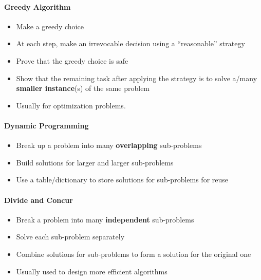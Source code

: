                 \paragraph{Greedy Algorithm}
                    \begin{itemize}
                        \item Make a greedy choice
                        \item At each step, make an irrevocable decision using a ``reasonable'' strategy
                        \item Prove that the greedy choice is safe
                        \item Show that the remaining task after applying the strategy is to solve a/many \textbf{smaller instance}(s) of the same problem
                        \item Usually for optimization problems.
                    \end{itemize}

                \paragraph{Dynamic Programming}
                    \begin{itemize}
                        \item Break up a problem into many \textbf{overlapping} sub-problems
                        \item Build solutions for larger and larger sub-problems
                        \item Use a table/dictionary to store solutions for sub-problems for reuse
                    \end{itemize}

                \paragraph{Divide and Concur}
                    \begin{itemize}
                        \item Break a problem into many \textbf{independent} sub-problems
                        \item Solve each sub-problem separately
                        \item Combine solutions for sub-problems to form a solution for the original one
                        \item Usually used to design more efficient algorithms
                    \end{itemize}

